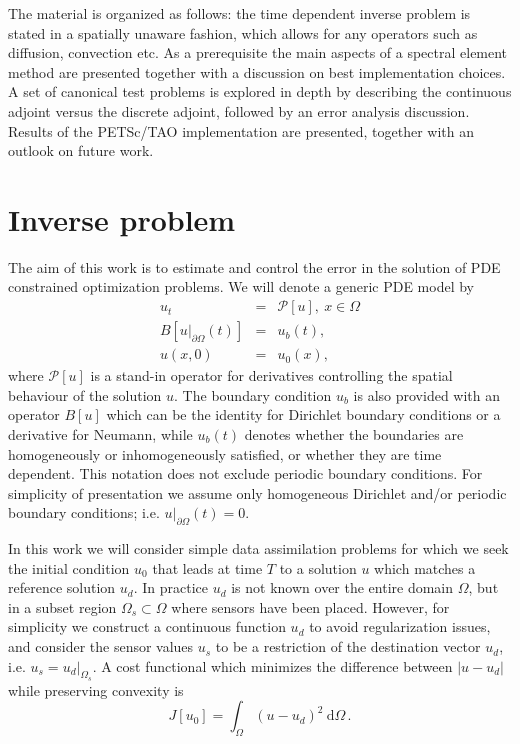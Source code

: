 \documentclass[10pt]{article}
\renewcommand{\d}{\mathrm{d}}
\newcommand{\dd}{\:\textrm{d}}
\newcommand{\CostFcn}{J}
\newcommand{\CostIntegrand}{g}
\begin{document}
The material is organized as follows: the time dependent inverse
problem is stated in a spatially unaware fashion, which allows for any
operators such as diffusion, convection etc. As a prerequisite the
main aspects of a spectral element method are presented together with
a discussion on best implementation choices. A set of canonical test
problems is explored in depth by describing the continuous adjoint
versus the discrete adjoint, followed by an error analysis
discussion. Results of the PETSc/TAO implementation are presented,
together with an outlook on future work.


  
\section{Inverse problem\label{sec:inverse}}
The aim of this work is to estimate and control the error in the solution of PDE constrained optimization problems. %
We will denote a generic PDE model by
\begin{eqnarray}
 u_t &=& \mathcal P[ u ] , \  x \in \Omega \\ \nonumber
   B[u|_{\partial \Omega}(t)]&=& u_b(t), \\ \nonumber
   u( x,0)&=& u_0( x),\nonumber
\label{eq:generic}\end{eqnarray} 
where $\mathcal P[ u ]$ is a stand-in operator for derivatives
controlling the spatial behaviour of the solution $u$. The boundary
condition $u_b$ is also provided with an operator $B[u]$ which can be
the identity for Dirichlet boundary conditions or a derivative for
Neumann, while $u_b(t)$ denotes whether the boundaries are
homogeneously or inhomogeneously satisfied, or whether they are time
dependent. This notation does not exclude periodic boundary
conditions. For simplicity of presentation we assume only homogeneous Dirichlet and/or periodic boundary conditions; i.e.  $u|_{\partial \Omega}(t)= 0.$

%
%

In this work we will consider simple data assimilation problems  for which we seek the initial condition $u_0$ that leads at time $T$ to a solution
$u$ which matches a reference solution $u_d$. In practice $ u_d$  is not known over the entire domain $\Omega$, but in a subset region $\Omega_s\subset \Omega$ where sensors have been placed. However, for simplicity we construct a continuous function
$u_d$ to avoid regularization issues, and consider the sensor values $u_s$ to be a restriction of the destination vector $u_d$, i.e. $u_s=u_d|_{\Omega_s}$. 
A cost functional which minimizes the difference between $| u- u_d|$ while preserving convexity is
\begin{equation}
  J[u_0]=\int_{\Omega}(u- u_d)^2 \ \d \Omega \,.  \label{eq:Cost_general}
\end{equation}
\end{document}
